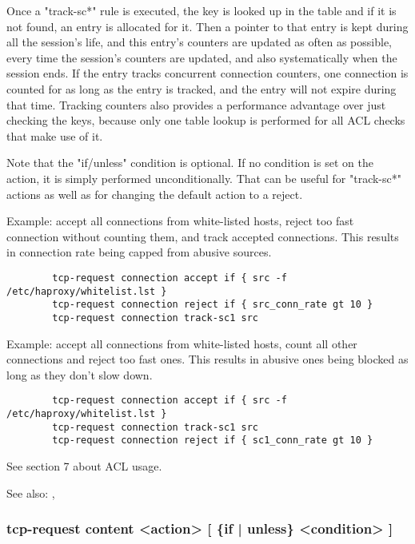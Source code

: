 \begin{itemize}
        Once a "track-sc*" rule is executed, the key is looked up in the table
        and if it is not found, an entry is allocated for it. Then a pointer to
        that entry is kept during all the session's life, and this entry's
        counters are updated as often as possible, every time the session's
        counters are updated, and also systematically when the session ends.
        If the entry tracks concurrent connection counters, one connection is
        counted for as long as the entry is tracked, and the entry will not
        expire during that time. Tracking counters also provides a performance
        advantage over just checking the keys, because only one table lookup is
        performed for all ACL checks that make use of it.
  \end{itemize}

  Note that the "if/unless" condition is optional. If no condition is set on
  the action, it is simply performed unconditionally. That can be useful for
  "track-sc*" actions as well as for changing the default action to a reject.

  Example: accept all connections from white-listed hosts, reject too fast
           connection without counting them, and track accepted connections.
           This results in connection rate being capped from abusive sources.

  \begin{verbatim}
        tcp-request connection accept if { src -f /etc/haproxy/whitelist.lst }
        tcp-request connection reject if { src_conn_rate gt 10 }
        tcp-request connection track-sc1 src
  \end{verbatim}

  Example: accept all connections from white-listed hosts, count all other
           connections and reject too fast ones. This results in abusive ones
           being blocked as long as they don't slow down.

  \begin{verbatim}
        tcp-request connection accept if { src -f /etc/haproxy/whitelist.lst }
        tcp-request connection track-sc1 src
        tcp-request connection reject if { sc1_conn_rate gt 10 }
  \end{verbatim}

  See section 7 about ACL usage.

  See also: , 

\subsubsection[tcp-request content]{tcp-request content <action> [ \{if | unless\} <condition> ]}

